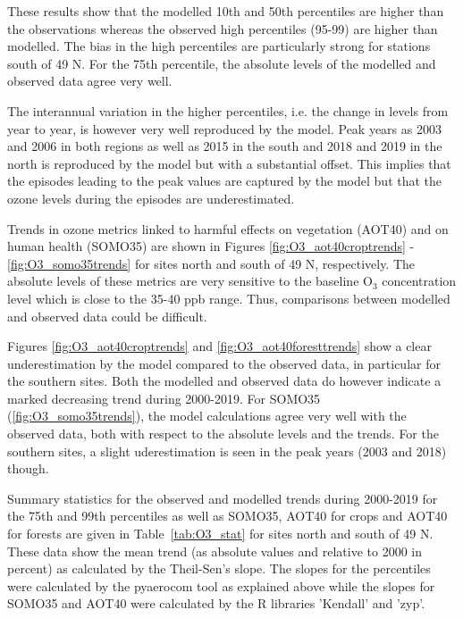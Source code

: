 These results show that the modelled 10th and 50th percentiles are higher than the observations whereas the observed high percentiles (95-99) are higher than modelled. The bias in the high percentiles are particularly strong for stations south of 49 \degrees N. For the 75th percentile, the absolute levels of the modelled and observed data agree very well. 

The interannual variation in the higher percentiles, i.e. the change in levels from year to year, is however very well reproduced by the model. Peak years as 2003 and 2006 in both regions as well as 2015 in the south and 2018 and 2019 in the north is reproduced by the model but with a substantial offset. This implies that the episodes leading to the peak values are captured by the model but that the ozone levels during the episodes are underestimated. 

Trends in ozone metrics linked to harmful effects on vegetation (AOT40) and on human health (SOMO35) are shown in Figures \ref{fig:O3_aot40croptrends} - \ref{fig:O3_somo35trends} for sites north and south of 49 \degrees N, respectively. The absolute levels of these metrics are very sensitive to the baseline O$_3$ concentration level which is close to the 35-40 ppb range. Thus, comparisons between modelled and observed data could be difficult. 

Figures \ref{fig:O3_aot40croptrends} and \ref{fig:O3_aot40foresttrends} show a clear underestimation by the model compared to the observed data, in particular for the southern sites. Both the modelled and observed data do however indicate a marked decreasing trend during 2000-2019. For SOMO35 (\ref{fig:O3_somo35trends}), the model calculations agree very well with the observed data, both with respect to the absolute levels and the trends. For the southern sites, a slight uderestimation is seen in the peak years (2003 and 2018) though. 

Summary statistics for the observed and modelled trends during 2000-2019 for the 75th and 99th percentiles as well as SOMO35, AOT40 for crops and AOT40 for forests are given in Table~\ref{tab:O3_stat} for sites north and south of 49 \degrees N. These data show the mean trend (as absolute values and relative to 2000 in percent) as calculated by the Theil-Sen's slope. The slopes for the percentiles were calculated by the pyaerocom tool as explained above while the slopes for SOMO35 and AOT40 were calculated by the R libraries 'Kendall' and 'zyp'. 

